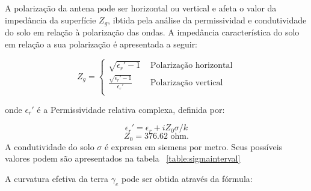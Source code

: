 A polarização da antena pode ser horizontal ou vertical e afeta o valor da impedância da superfície \begin{math}Z_g\end{math}, ibtida pela análise da permissividad e condutividade do solo em relação à polarização das ondas. A impedância característica do solo em relação a sua polarização é apresentada a seguir:


\[ Z_g = \begin{cases} 
      \sqrt{\epsilon_r' - 1} & \textrm{ Polarização horizontal} \\
      \frac{\sqrt{\epsilon_r' - 1}}{\epsilon_r'} & \textrm{ Polarização vertical} \\
   \end{cases} \]

onde \begin{math}\epsilon_r'\end{math} é a Permissividade relativa complexa, definida por:

\[ 
\epsilon_r' = \epsilon_r + i Z_0\sigma/k
\]
\[
Z_0 = 376.62 \textrm{ ohm.}
\]
A condutividade do solo $\sigma$ é expressa em siemens por metro. Seus possíveis valores podem são apresentados na tabela ~\ref{table:sigmainterval}

\begin{table}[h]
\caption[Valores para a permissividade relativa e condutividade do solo.]
{Valores para a permissividade relativa e condutividade do solo.}
\label{table:sigmainterval}
\centering
{}
\end{table}

A curvatura efetiva da terra $\gamma_e$ pode ser obtida através da fórmula:

